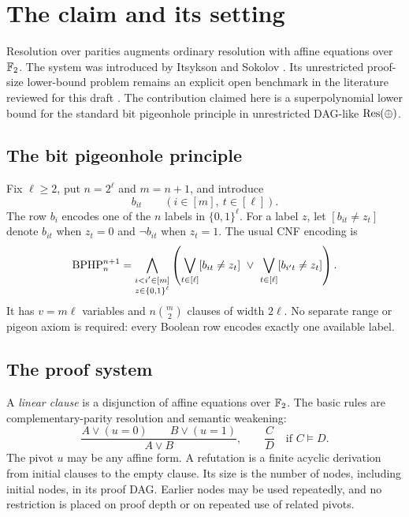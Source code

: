 \section{The claim and its setting}\label{sec:introduction}

Resolution over parities augments ordinary resolution with affine equations
over \(\mathbb F_2\). The system was introduced by Itsykson and Sokolov
\cite{IS14,IS20}. Its unrestricted proof-size lower-bound problem remains an
explicit open benchmark in the literature reviewed for this draft
\cite{IPS26}. The contribution claimed here is a superpolynomial lower
bound for the standard bit pigeonhole principle in unrestricted DAG-like
\(\mathrm{Res}(\oplus)\).

\subsection{The bit pigeonhole principle}
Fix \(\ell\ge2\), put \(n=2^\ell\) and \(m=n+1\), and introduce
\[
  b_{it}\qquad (i\in[m],\ t\in[\ell]).
\]
The row \(b_i\) encodes one of the \(n\) labels in \(\{0,1\}^{\ell}\).
For a label \(z\), let \([b_{it}\ne z_t]\) denote \(b_{it}\) when \(z_t=0\)
and \(\neg b_{it}\) when \(z_t=1\). The usual CNF encoding is
\begin{equation}\label{eq:bit-php}
 \mathrm{BPHP}_n^{n+1}
  =\bigwedge_{\substack{i<i'\in[m]\\z\in\{0,1\}^{\ell}}}
    \left(\bigvee_{t\in[\ell]}[b_{it}\ne z_t]
       \ \vee\ \bigvee_{t\in[\ell]}[b_{i't}\ne z_t]\right).
\end{equation}
It has \(v=m\ell\) variables and \(n\binom m2\) clauses of width \(2\ell\).
No separate range or pigeon axiom is required: every Boolean row encodes
exactly one available label.

\subsection{The proof system}
A \emph{linear clause} is a disjunction of affine equations over \(\mathbb F_2\).
The basic rules are complementary-parity resolution and semantic weakening:
\begin{equation}\label{eq:res-rules}
 \frac{A\vee(u=0)\qquad B\vee(u=1)}{A\vee B},
 \qquad
 \frac{C}{D}\quad\text{if } C\models D.
\end{equation}
The pivot \(u\) may be any affine form. A refutation is a finite acyclic
derivation from initial clauses to the empty clause. Its size is the number
of nodes, including initial nodes, in its proof DAG. Earlier nodes may be
used repeatedly, and no restriction is placed on proof depth or on repeated
use of related pivots.


